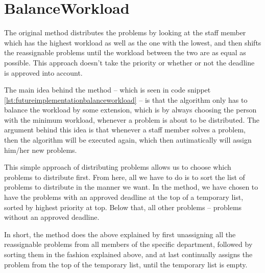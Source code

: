 \section{BalanceWorkload}
\label{sec:futureimplementationbalanceworkload}

The original  method distributes the problems by looking at the staff member which has the highest workload as well as the one with the lowest, and then shifts the reassignable problems until the workload between the two are as equal as possible. This approach doesn't take the priority or whether or not the deadline is approved into account. 

The main idea behind the  method -- which is seen in code snippet \ref{lst:futureimplementationbalanceworkload} -- is that the algorithm only has to balance the workload by some extension, which is by always choosing the person with the minimum workload, whenever a problem is about to be distributed. The argument behind this idea is that whenever a staff member solves a problem, then the algorithm will be executed again, which then autimatically will assign him/her new problems.

This simple approach of distributing problems allows us to choose which problems to distribute first. From here, all we have to do is to sort the list of problems to distribute in the manner we want. In the  method, we have chosen to have the problems with an approved deadline at the top of a temporary list, sorted by highest priority at top. Below that, all other problems -- problems without an approved deadline.

In short, the  method does the above explained by first unassigning all the reassignable problems from all members of the specific department, followed by sorting them in the fashion explained above, and at last continually assigns the problem from the top of the temporary list, until the temporary list is empty.

